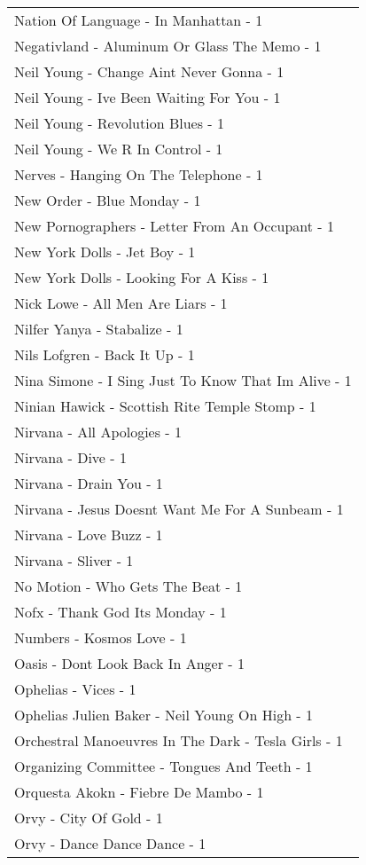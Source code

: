 \documentclass[
]{article}
\begin{document}
\begin{longtable}{l}
Nation Of Language - In Manhattan - 1 \\ 
Negativland - Aluminum Or Glass The Memo - 1 \\ 
Neil Young - Change Aint Never Gonna - 1 \\ 
Neil Young - Ive Been Waiting For You - 1 \\ 
Neil Young - Revolution Blues - 1 \\ 
Neil Young - We R In Control - 1 \\ 
Nerves - Hanging On The Telephone - 1 \\ 
New Order - Blue Monday - 1 \\ 
New Pornographers - Letter From An Occupant - 1 \\ 
New York Dolls - Jet Boy - 1 \\ 
New York Dolls - Looking For A Kiss - 1 \\ 
Nick Lowe - All Men Are Liars - 1 \\ 
Nilfer Yanya - Stabalize - 1 \\ 
Nils Lofgren - Back It Up - 1 \\ 
Nina Simone - I Sing Just To Know That Im Alive - 1 \\ 
Ninian Hawick - Scottish Rite Temple Stomp - 1 \\ 
Nirvana - All Apologies - 1 \\ 
Nirvana - Dive - 1 \\ 
Nirvana - Drain You - 1 \\ 
Nirvana - Jesus Doesnt Want Me For A Sunbeam - 1 \\ 
Nirvana - Love Buzz - 1 \\ 
Nirvana - Sliver - 1 \\ 
No Motion - Who Gets The Beat - 1 \\ 
Nofx - Thank God Its Monday - 1 \\ 
Numbers - Kosmos Love - 1 \\ 
Oasis - Dont Look Back In Anger - 1 \\ 
Ophelias - Vices - 1 \\ 
Ophelias Julien Baker - Neil Young On High - 1 \\ 
Orchestral Manoeuvres In The Dark - Tesla Girls - 1 \\ 
Organizing Committee - Tongues And Teeth - 1 \\ 
Orquesta Akokn - Fiebre De Mambo - 1 \\ 
Orvy - City Of Gold - 1 \\ 
Orvy - Dance Dance Dance - 1 \\ 

\end{longtable}
\end{document}
